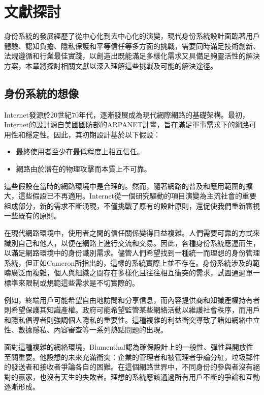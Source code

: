 
\chapter{文獻探討}
身份系統的發展經歷了從中心化到去中心化的演變，現代身份系統設計面臨著用戶體驗、認知負擔、隱私保護和平等信任等多方面的挑戰，需要同時滿足技術創新、法規遵循和行業最佳實踐，以創造出既能滿足多樣化需求又具備足夠靈活性的解決方案，本章將探討相關文獻以深入理解這些挑戰及可能的解決途徑。
\section{身份系統的想像}
Internet發源於20世紀70年代，逐漸發展成為現代網際網路的基礎架構。最初，Internet的設計源自美國國防部的ARPANET計畫，旨在滿足軍事需求下的網路可用性和穩定性。因此，其初期設計基於以下假設\cite{Pekka2010HIP}：
\begin{itemize}
  \item 最終使用者至少在最低程度上相互信任。
  \item 網路由於潛在的物理攻擊而本質上不可靠。
\end{itemize}
這些假設在當時的網路環境中是合理的。然而，隨著網路的普及和應用範圍的擴大，這些假設已不再適用\cite{tomorrowinternet}。Internet從一個研究驅動的項目演變為主流社會的重要組成部分，新的需求不斷湧現，不僅挑戰了原有的設計原則，還促使我們重新審視一些既有的原則。

在現代網路環境中，使用者之間的信任關係變得日益複雜。人們需要可靠的方式來識別自己和他人，以便在網路上進行交流和交易。因此，各種身份系統應運而生，以滿足網路環境中的身份識別需求。儘管人們希望找到一種統一而理想的身份管理系統，但正如Cameron\cite{cameron2005laws}所指出的，這樣的系統實際上並不存在。身份系統涉及的範疇廣泛而複雜，個人與組織之間存在多樣化且往往相互衝突的需求，試圖通過單一標準來限制或規範這些需求是不切實際的。

例如，終端用戶可能希望自由地訪問和分享信息，而內容提供商和知識產權持有者則希望保護其知識產權。政府可能希望監管某些網絡活動以維護社會秩序，而用戶和隱私倡導者則強調個人隱私的重要性。這種複雜的利益衝突導致了諸如網絡中立性、數據隱私、內容審查等一系列熱點問題的出現\cite{Wu2003NetworkNeutrality}。

面對這種複雜的網絡環境，Blumenthal\cite{Blumenthal2001RethinkingThe}認為確保設計上的一般性、彈性與開放性至關重要。他設想的未來充滿衝突：企業的管理者和被管理者爭論分紅，垃圾郵件的發送者和接收者爭論各自的困難。在這個網路世界中，不同身份的參與者沒有絕對的贏家，也沒有天生的失敗者。理想的系統應該通過所有用戶不斷的爭論和互動逐漸形成。

